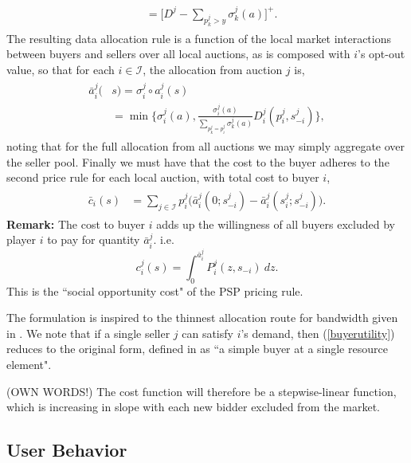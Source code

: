 \documentclass[12pt]{article}
\theoremstyle{definition}
\newcommand{\mcI}{\mathcal{I}}
\newcommand{\g}{\sigma}
\begin{document}
\begin{multicols}{2}
\begin{align}
\begin{split}
    &= \bigg\lbrack D^j - \sum_{p_k^j> y} \g_k^j(a)\bigg\rbrack^+.
\end{split}
\end{align}
The resulting data allocation rule is a function of the local market
interactions between buyers and sellers over all local auctions, as is composed with $i$'s opt-out value, so that for each $i \in \mcI$, the
allocation from auction $j$ is,
\begin{align}\label{dataallocation}
\begin{split}
    \bar{a}_i^j(&s) = \g_i^j \circ a_i^j(s) \\
    &= \min\bigg\lbrace \g_i^j(a), 
    \frac{\g_i^j(a)}{\displaystyle\sum_{p_k^j= p_i^j}\g_k^j(a)} 
D_i^j(p_i^j,s_{-i}^j)\bigg\rbrace,
\end{split}
\end{align}
noting that for the full allocation from all auctions we may simply aggregate
over the seller pool.
Finally we must have that the cost to the buyer adheres to the second price
rule for each local auction, with total cost to buyer $i$,
\begin{align}\label{datacost}
\begin{split}
    \bar{c}_i(s) &= \displaystyle\sum_{j\in\mcI} 
    p_i^j \bigg(\bar{a}_i^j(0; s_{-i}^j)
    -\bar{a}_i^j(s_i^j;s_{-i}^j)\bigg).
\end{split}
\end{align}
\textbf{Remark:} The cost to buyer $i$ adds up the willingness
of all buyers excluded by player $i$ to pay for quantity $\bar{a}_i^j$. i.e.
$$
    c_i^j(s) = \displaystyle\int_0^{\bar{a}_i^j} P_i^j(z, s_{-i}) \ dz.
$$
This is the ``social opportunity cost" of the PSP pricing rule.

The formulation is inspired to the thinnest allocation route for
bandwidth given in \cite{lazar}. We note that if a single seller $j$ can
satisfy $i$'s demand, then
(\ref{buyerutility}) reduces to the original form, defined in
\cite{semret} as ``a simple buyer at a single resource element".

(OWN WORDS!)
The cost function will therefore be a stepwise-linear function, which is
increasing in slope with each new bidder excluded from the market.

\subsection{User Behavior}


\end{multicols}
\end{document}
